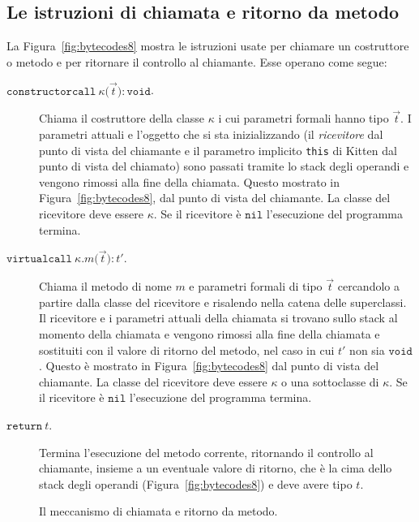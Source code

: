 \subsection{Le istruzioni di chiamata e ritorno da metodo}
  \label{subsec:call_return}
%
La Figura~\ref{fig:bytecodes8} mostra le istruzioni usate per chiamare
un costruttore o metodo e per ritornare il controllo al chiamante.
Esse operano come segue:
%
\begin{description}
\item[\underline{$\mathtt{constructorcall\ \kappa
  (}$$\vec{t}$$\mathtt{):void}$}.]
  Chiama il costruttore della classe $\kappa$ i cui parametri formali hanno
  tipo $\vec{t}$. I parametri attuali e l'oggetto che si sta inizializzando
  (\cioe il \emph{ricevitore} dal punto di vista del chiamante e
  il parametro implicito \texttt{this} di Kitten dal punto di vista del
  chiamato) sono passati
  tramite lo stack degli operandi e vengono rimossi alla fine
  della chiamata. Questo \e mostrato in Figura~\ref{fig:bytecodes8}, dal punto
  di vista del chiamante. La classe del ricevitore deve essere $\kappa$.
  Se il ricevitore \`e $\mathtt{nil}$ l'esecuzione del programma termina.
\item[\underline{$\mathtt{virtualcall\ \kappa.\mathit{m}
  (}$$\vec{t}$$\mathtt{):\mathit{t'}}$}.]
  Chiama il metodo di nome $m$ e parametri formali di tipo $\vec{\mathit{t}}$
  cercandolo a partire dalla classe del ricevitore e risalendo nella
  catena delle superclassi. Il ricevitore e i parametri attuali della chiamata
  si trovano sullo stack al momento della chiamata e vengono rimossi
  alla fine della chiamata e sostituiti con il valore di ritorno del metodo,
  nel caso in cui $\mathit{t'}$ non sia $\mathtt{void}$. Questo \`e
  mostrato in Figura~\ref{fig:bytecodes8} dal punto di vista del chiamante.
  La classe del ricevitore deve essere $\kappa$ o una sottoclasse di $\kappa$.
  Se il ricevitore \`e $\mathtt{nil}$ l'esecuzione del programma termina.
\item[\underline{$\mathtt{return\ \mathit{t}}$}.]
  Termina l'esecuzione del metodo corrente, ritornando il controllo al
  chiamante, insieme a un eventuale valore di ritorno, che \`e la cima dello
  stack degli operandi (Figura~\ref{fig:bytecodes8}) e deve avere tipo $t$.
\end{description}
%
\begin{figure}[t]
\begin{center}
\end{center}
\caption{Il meccanismo di chiamata e ritorno da metodo.}
  \label{fig:callercallee}
\end{figure}

